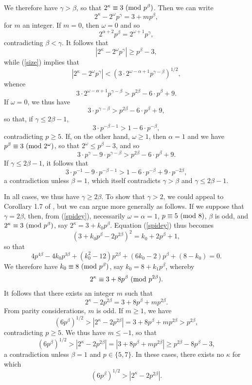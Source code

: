 \documentclass{amsart}
\def\mod#1{{\ifmmode\text{\rm\ (mod~$#1$)}
\else\discretionary{}{}{\hbox{ }}\rm(mod~$#1$)\fi}}
\begin{document}
{We therefore have $\gamma > \beta$, so that $2^\kappa \equiv 3 \mod{p^\beta}$. Then we can write
$$
2^\kappa - 2^\omega p^\gamma = 3+m p^\beta, 
$$
for $m$ an integer. If $m=0$, then $\omega=0$ and so
$$
2^{\alpha+2} p^\beta  = 2^{\omega+1} p^\gamma,
$$
contradicting $\beta < \gamma$. It follows that 
$$
\left| 2^\kappa - 2^\omega p^\gamma \right| \geq p^\beta-3,
$$
while (\ref{size}) implies that
$$
\left| 2^\kappa - 2^\omega p^\gamma \right| < \left(
3 \cdot 2^{\omega-\alpha+1} p^{\gamma-\beta}
 \right)^{1/2},
$$
whence
$$
3 \cdot 2^{\omega-\alpha+1} p^{\gamma-\beta} > p^{2\beta}-6 \cdot p^\beta+9.
$$
If $\omega=0$, we thus have
$$
3 \cdot p^{\gamma-\beta} > p^{2\beta}-6 \cdot p^\beta+9,
$$
so that, if $\gamma \leq 2\beta-1$,
$$
3 \cdot p^{-\beta-1} > 1-6 \cdot p^{-\beta},
$$
contradicting $p \geq 5$.
If, on the other hand, $\omega \geq 1$, then $\alpha=1$ and we have $p^\beta \equiv 3 \mod{2^\omega}$, so that $2^\omega \leq p^\beta-3$, and so
$$
3 \cdot p^\gamma - 9 \cdot  p^{\gamma-\beta} > p^{2\beta}-6 \cdot p^\beta+9.
$$
If $\gamma \leq 2\beta-1$, it follows that
$$
3 \cdot p^{-1} - 9 \cdot  p^{-\beta-1} > 1-6 \cdot p^{-\beta}+9 \cdot p^{-2\beta},
$$
a contradiction unless $\beta=1$, which itself contradicts $\gamma > \beta$ and $\gamma \leq 2\beta-1$.

In all cases, we thus have $\gamma \geq 2 \beta$. To show that $\gamma > 2$, we could appeal to Corollary 1.7 of \cite{BaBe}, but we can argue more generally as follows. If we suppose that $\gamma=2\beta$, then, from (\ref{spidey}), necessarily $\omega=\alpha=1$, $p \equiv 5 \mod{8}$, $\beta$ is odd, and $2^\kappa \equiv 3 \mod{p^\beta}$, say $2^\kappa=3+k_0p^\beta$. Equation (\ref{spidey}) thus becomes
$$
(3+k_0p^\beta-2 p^{2\beta})^2 = k_0+2 p^{\beta} +1,
$$
so that 
$$
4p^{4\beta} -4k_0p^{3\beta} + (k_0^2-12) p^{2\beta}+(6k_0-2)p^\beta +(8-k_0)= 0.
$$
We therefore have $k_0 \equiv 8 \mod{p^\beta}$, say $k_0=8+k_1 p^\beta$, whereby 
$$
2^\kappa \equiv 3 + 8 p^\beta \mod{p^{2\beta}}.
$$
It follows that there exists an integer $m$ such that 
$$
2^\kappa - 2 p^{2\beta} = 3 + 8 p^\beta + m p^{2\beta}.
$$
From parity considerations, $m$ is odd. If $m \geq 1$, we have
$$
\left( 6 p^\beta \right)^{1/2} > \left| 2^\kappa - 2 p^{2\beta} \right| = 
3 + 8 p^\beta + m p^{2\beta} > p^{2\beta},
$$
contradicting $p \geq 5$.
We thus have $m \leq -1$, so that
$$
\left( 6 p^\beta \right)^{1/2} > \left| 2^\kappa - 2 p^{2\beta} \right| = 
\left| 3 + 8 p^\beta + m p^{2\beta} \right|  \geq p^{2\beta}-8 p^\beta-3,
$$
a contradiction unless $\beta=1$ and $p \in \{ 5, 7 \}$. In these cases, there exists no $\kappa$ for which
$$
\left( 6 p^\beta \right)^{1/2} > \left| 2^\kappa - 2 p^{2\beta} \right|.
$$

}
\end{document}
